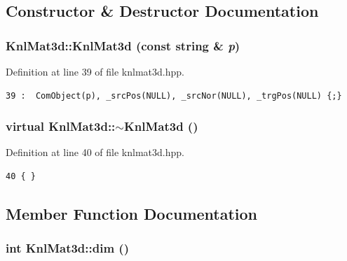 \subsection{Constructor \& Destructor Documentation}
\subsubsection{\setlength{\rightskip}{0pt plus 5cm}Knl\-Mat3d::Knl\-Mat3d (const string \& {\em p})\hspace{0.3cm}{\tt  [inline]}}\label{classKnlMat3d_e5c3a44fa56c9abf153bdcd2fd4acca6_e5c3a44fa56c9abf153bdcd2fd4acca6}




Definition at line 39 of file knlmat3d.hpp.

\footnotesize\begin{verbatim}39 :  ComObject(p), _srcPos(NULL), _srcNor(NULL), _trgPos(NULL) {;}
\end{verbatim}\normalsize 


\subsubsection{\setlength{\rightskip}{0pt plus 5cm}virtual Knl\-Mat3d::$\sim$Knl\-Mat3d ()\hspace{0.3cm}{\tt  [inline, virtual]}}\label{classKnlMat3d_41844e50417d0e54dd36950b66babb7f_41844e50417d0e54dd36950b66babb7f}




Definition at line 40 of file knlmat3d.hpp.

\footnotesize\begin{verbatim}40 { }
\end{verbatim}\normalsize 




\subsection{Member Function Documentation}
\subsubsection{\setlength{\rightskip}{0pt plus 5cm}int Knl\-Mat3d::dim ()\hspace{0.3cm}{\tt  [inline]}}\label{classKnlMat3d_e3f9953141ca7d7525b58c0ff1ef6b1f_e3f9953141ca7d7525b58c0ff1ef6b1f}


